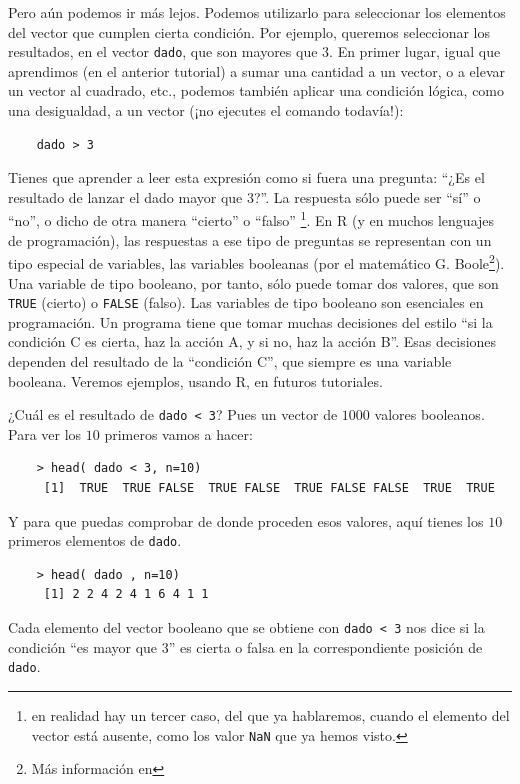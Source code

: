\documentclass[10pt,a4paper]{article}\usepackage[]{graphicx}\usepackage[]{color}
\begin{document}
Pero aún podemos ir más lejos. Podemos utilizarlo para seleccionar los elementos del vector que cumplen cierta condición. Por ejemplo, queremos seleccionar los resultados, en el vector {\tt dado}, que son mayores que 3. En primer lugar, igual que aprendimos (en el anterior tutorial) a sumar una cantidad a un vector, o a elevar un vector al cuadrado, etc., podemos también aplicar una condición lógica, como una desigualdad, a un vector (¡no ejecutes el comando todavía!):
\begin{verbatim}
    dado > 3
\end{verbatim}
Tienes que aprender a leer esta expresión como si fuera una pregunta: ``¿Es el resultado de lanzar el dado mayor que $3$?''. La respuesta sólo puede ser ``sí'' o ``no'', o dicho de otra manera ``cierto'' o ``falso'' \footnote{en realidad hay un tercer caso, del que ya hablaremos, cuando el elemento del vector está ausente, como los valor {\tt NaN} que ya hemos visto.}. En R (y en muchos lenguajes de programación), las respuestas a ese tipo de preguntas se representan con un tipo especial de variables, las {\sf variables  booleanas} (por el matemático G. Boole\footnote{Más información en  }). Una variable de tipo booleano, por tanto, sólo puede tomar dos valores, que son {\tt TRUE} (cierto) o {\tt FALSE} (falso). Las variables de tipo booleano son esenciales en programación. Un programa tiene que tomar muchas decisiones del estilo ``si la condición C es cierta, haz la acción A, y si no, haz la acción B''. Esas decisiones dependen del resultado de la ``condición C'', que siempre es una variable booleana. Veremos ejemplos, usando R, en futuros tutoriales.


¿Cuál es el resultado de {\tt dado < 3}? Pues un vector de $1000$ valores booleanos. Para ver los $10$ primeros vamos a hacer:
\begin{verbatim}
    > head( dado < 3, n=10)
     [1]  TRUE  TRUE FALSE  TRUE FALSE  TRUE FALSE FALSE  TRUE  TRUE
\end{verbatim}
Y para que puedas comprobar de donde proceden esos valores,  aquí tienes los $10$ primeros elementos de {\tt dado}.
\begin{verbatim}
    > head( dado , n=10)
     [1] 2 2 4 2 4 1 6 4 1 1
\end{verbatim}
Cada elemento del vector booleano que se obtiene con {\tt dado < 3} nos dice si la condición ``es mayor que 3'' es cierta o falsa en la correspondiente posición de {\tt dado}.
\end{document}
